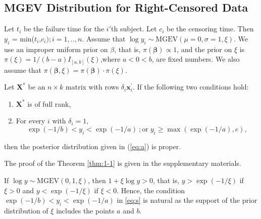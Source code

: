 \documentclass[smallextended]{svjour3}       %
\begin{document}
{\subsection{MGEV Distribution for Right-Censored Data}\label{sec1}
\noindent
Let $t_{i}$ be the failure time for the $i'$th subject. Let $c_{i}$ be the censoring time. Then
$y_{i}$ = min($t_{i}$,$c_{i});i=1,..,n$. Assume that $\log y_{i}\sim\mbox{MGEV}(\mu=0,\sigma=1,\xi)$.
We use an improper uniform prior on $\beta$, that is, $\pi(\mathbf{\beta})\varpropto1$,
and the prior on $\xi$ is $\pi(\xi)= 1/(b-a) I_{[a,b]}(\xi)$,where $a<0<b$,
are fixed numbers. We also assume that $\pi(\mathbf{\beta},\xi)=\pi(\mathbf{\beta})\cdot\pi(\xi)$.

\begin{theorem} \label{thm:1-1}
Let $\mathbb{\mathbf{X}}^{*}$ be
an $n\times k$ matrix with rows $\delta_{i}\mathbf{x}_{i}^{\prime}$.
If the following two conditions hold:

\begin{enumerate}
\item $\mathbb{\mathbf{X}}^{*}$ is of full rank,
\item For every $i$ with $\delta_{i}=1,$
\begin{equation}
\exp(- 1/ b)< y_{i} < \exp(- 1/a)\ ;\mbox{or}\; y_{i}\geq\max(\exp(-1/a),e),\label{eq:s}
\end{equation}
\end{enumerate}
then the posterior distribution given in (\ref{eq:a}) is proper.
\end{theorem}
\noindent
The proof of the Theorem \ref{thm:1-1} is given in the supplementary materials.

\begin{remark}
  \label{rem:cond}
  If $\log y \sim\mbox{MGEV}(0,1,\xi)$, then $1+ \xi \log y >0$, that
  is, $y > \exp(- 1/\xi)$ if $\xi >0$ and $y < \exp(- 1/\xi)$ if $\xi
  <0$. Hence, the condition $\exp(- 1/ b)< y_{i} < \exp(- 1/a)$ in
  \eqref{eq:s} is natural as the support of the prior distribution of
  $\xi$ includes the points $a$ and $b$.
\end{remark}

\begin{remark}


\end{remark}}
\end{document}
